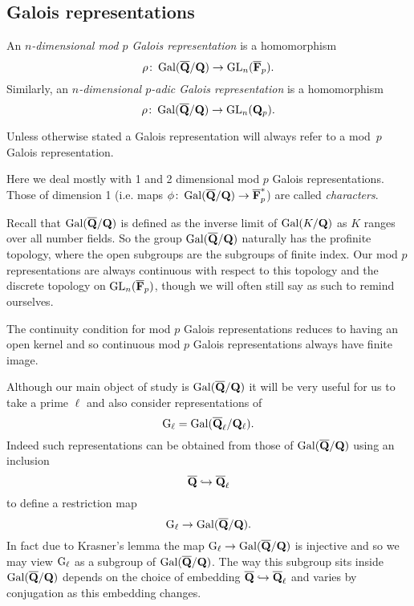 \documentclass[a4paper,12pt]{article}
\begin{document}
\subsection{Galois representations}\label{sec:gals}
\begin{defn}
An \emph{$n$-dimensional mod $p$ Galois representation} is a homomorphism
\[
\rho\colon \operatorname{Gal}(\overline{\mathbf{Q}}/\mathbf{Q}) \to \operatorname{GL}_n(\overline{\mathbf{F}}_p).
\]
Similarly, an \emph{$n$-dimensional $p$-adic Galois representation} is a homomorphism
\[
\rho\colon \operatorname{Gal}(\overline{\mathbf{Q}}/\mathbf{Q}) \to \operatorname{GL}_n(\mathbf{Q}_p).
\]

Unless otherwise stated a Galois representation will always refer to a mod~$p$ Galois representation.
\end{defn}

Here we deal mostly with 1 and 2 dimensional mod $p$ Galois representations.
Those of dimension 1 (i.e. maps $\phi\colon\operatorname{Gal}(\overline{\mathbf{Q}}/\mathbf{Q}) \to \overline{\mathbf{F}}_p^*$) are called \emph{characters}.

Recall that $\operatorname{Gal}(\overline{\mathbf{Q}}/\mathbf{Q})$ is defined as the inverse limit of $\operatorname{Gal}(K/\mathbf{Q})$ as $K$ ranges over all number fields.
So the group $\operatorname{Gal}(\overline{\mathbf{Q}}/\mathbf{Q})$ naturally has the profinite topology, where the open subgroups are the subgroups of finite index.
Our mod $p$ representations are always continuous with respect to this topology and the discrete topology on $\operatorname{GL}_n(\overline{\mathbf{F}}_p)$, though we will often still say as such to remind ourselves.

\begin{rmk}\label{rmk:ctsfin}
The continuity condition for mod $p$ Galois representations reduces to having an open kernel and so continuous mod $p$ Galois representations always have finite image.
\end{rmk}

Although our main object of study is $\operatorname{Gal}(\overline{\mathbf{Q}}/\mathbf{Q})$ it will be very useful for us to take a prime $\ell$ and also consider representations of
\[
\mathrm{G}_\ell = \operatorname{Gal}(\overline{\mathbf{Q}}_\ell/\mathbf{Q}_\ell).
\]
Indeed such representations can be obtained from those of $\operatorname{Gal}(\overline{\mathbf{Q}}/\mathbf{Q})$ using an inclusion
\[
\overline{\mathbf{Q}} \hookrightarrow \overline{\mathbf{Q}}_\ell
\]
to define a restriction map
\[
\mathrm{G}_\ell \to \operatorname{Gal}(\overline{\mathbf{Q}}/\mathbf{Q}).
\]
In fact due to Krasner's lemma \cite[p. 238]{Cohen} the map $\mathrm{G}_\ell \to \operatorname{Gal}(\overline{\mathbf{Q}}/\mathbf{Q})$ is injective and so we may view $\mathrm{G}_\ell$ as a subgroup of $\operatorname{Gal}(\overline{\mathbf{Q}}/\mathbf{Q})$.
The way this subgroup sits inside $\operatorname{Gal}(\overline{\mathbf{Q}}/\mathbf{Q})$ depends on the choice of embedding $\overline{\mathbf{Q}} \hookrightarrow \overline{\mathbf{Q}}_\ell$ and varies by conjugation as this embedding changes.
\end{document}
